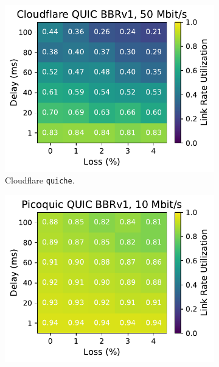 \begin{figure}[ht]
\begin{subfigure}[b]{0.22\linewidth}
        \includegraphics[width=\linewidth,trim={0 0 2cm 0},clip]{splitting/figures/heatmaps/heatmap_quiche_bbr1_50mbps.pdf}
        \caption{Cloudflare \texttt{quiche}.}
    \end{subfigure}
    \begin{subfigure}[b]{0.22\linewidth}
        \includegraphics[width=\linewidth,trim={0 0 2cm 0},clip]{splitting/figures/heatmaps/heatmap_picoquic_bbr1_10mbps.pdf}

\end{subfigure}
\end{figure}
